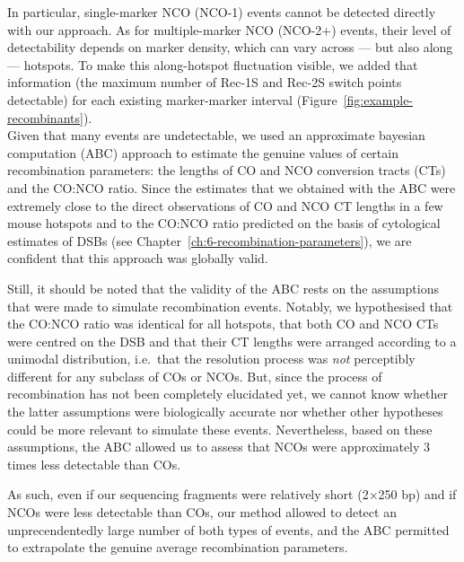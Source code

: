 In particular, single-marker NCO (NCO-1) events cannot be detected directly with our approach.
As for multiple-marker NCO (NCO-2+) events, their level of detectability depends on marker density, which can vary across — but also along — hotspots.
To make this along-hotspot fluctuation visible, we added that information (the maximum number of Rec-1S and Rec-2S switch points detectable) for each existing marker-marker interval (Figure~\ref{fig:example-recombinants}).\\

Given that many events are undetectable, we used an approximate bayesian computation (ABC) approach to estimate the genuine values of certain recombination parameters: the lengths of CO and NCO conversion tracts (CTs) and the CO:NCO ratio.
Since the estimates that we obtained with the ABC were extremely close to the direct observations of CO and NCO CT lengths in a few mouse hotspots and to the CO:NCO ratio predicted on the basis of cytological estimates of DSBs (see Chapter~\ref{ch:6-recombination-parameters}), we are confident that this approach was globally valid.

Still, it should be noted that the validity of the ABC rests on the assumptions that were made to simulate recombination events. 
Notably, we hypothesised that the CO:NCO ratio was identical for all hotspots, that both CO and NCO CTs were centred on the DSB and that their CT lengths were arranged according to a unimodal distribution, i.e.\ that the resolution process was \textit{not} perceptibly different for any subclass of COs or NCOs.
But, since the process of recombination has not been completely elucidated yet, we cannot know whether the latter assumptions were biologically accurate nor whether other hypotheses could be more relevant to simulate these events.
Nevertheless, based on these assumptions, the ABC allowed us to assess that NCOs were approximately 3 times less detectable than COs.

As such, even if our sequencing fragments were relatively short (2$\times$250 bp) and if NCOs were less detectable than COs, our method allowed to detect an unprecendentedly large number of both types of events, and the ABC permitted to extrapolate the genuine average recombination parameters.\\

